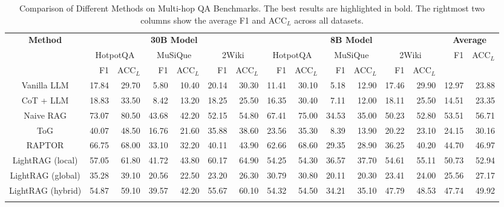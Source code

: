 \begin{table}[!htbp]
\centering
\caption{Comparison of Different Methods on Multi-hop QA Benchmarks. 
The best results are highlighted in bold. The rightmost two columns show the average F1 and ACC$_L$ across all datasets.}
\label{tab:main_results}
\renewcommand{\arraystretch}{1.25}
\setlength{\tabcolsep}{5pt}

\begin{adjustbox}{max width=\textwidth}
\begin{tabular}{c|rr|rr|rr|rr|rr|rr|rr}
\toprule
\multirow{2}{*}{\textbf{Method}} 
& \multicolumn{6}{c|}{\textbf{30B Model}} 
& \multicolumn{6}{c|}{\textbf{8B Model}} 
& \multicolumn{2}{c}{\textbf{Average}} \\ 
\cmidrule(lr){2-15}
& \multicolumn{2}{c|}{HotpotQA} & \multicolumn{2}{c|}{MuSiQue} & \multicolumn{2}{c|}{2Wiki} 
& \multicolumn{2}{c|}{HotpotQA} & \multicolumn{2}{c|}{MuSiQue} & \multicolumn{2}{c|}{2Wiki} 
& F1 & ACC$_L$ \\ 
\cmidrule(lr){2-15}
& F1 & ACC$_L$ & F1 & ACC$_L$ & F1 & ACC$_L$
& F1 & ACC$_L$ & F1 & ACC$_L$ & F1 & ACC$_L$ &  &  \\ 
\midrule
Vanilla LLM      & 17.84 & 29.70 & 5.80 & 10.40 & 20.14 & 30.30 & 11.41 & 30.10 & 5.18 & 12.90 & 17.46 & 29.90 & 12.97 & 23.88 \\
CoT + LLM        & 18.83 & 33.50 & 8.42 & 13.20 & 18.25 & 25.50 & 16.35 & 30.40 & 7.11 & 12.00 & 18.11 & 25.50 & 14.51 & 23.35 \\
Naive RAG        & 73.07 & 80.50 & 43.68 & 42.20 & 52.15 & 54.80 & 67.41 & 75.00 & 34.53 & 35.00 & 50.23 & 52.80 & 53.51 & 56.71 \\
ToG              & 40.07 & 48.50 & 16.76 & 21.60 & 35.88 & 38.60 & 23.56 & 35.30 & 8.39 & 13.90 & 20.22 & 23.10 & 24.15 & 30.16 \\
RAPTOR         & 66.75 & 68.00 & 33.10 & 32.20 & 40.11 & 43.90 & 62.66 & 68.60 & 29.35 & 28.90 & 36.25 & 40.20 & 44.70 & 46.97 \\
LightRAG (local)         & 57.05 & 61.80 & 41.72 & 43.80 & 60.17 & 64.90 & 54.25 & 54.30 & 36.57 & 37.70 & 54.61 & 55.11 & 50.73 & 52.94 \\
LightRAG (global)         & 35.28 & 39.10 & 20.56 & 22.50 & 23.20 & 26.30 & 30.79 & 30.80 & 20.11 & 20.30 & 23.41 & 24.00 & 25.56 & 27.17 \\
LightRAG (hybrid)         & 54.87 & 59.10 & 39.57 & 42.20 & 55.67 & 60.10 & 54.32 & 54.50 & 34.21 & 35.10 & 47.79 & 48.53 & 47.74 & 49.92 \\
\rowcolor{hippogreen}

\end{tabular}
\end{adjustbox}
\end{table}
